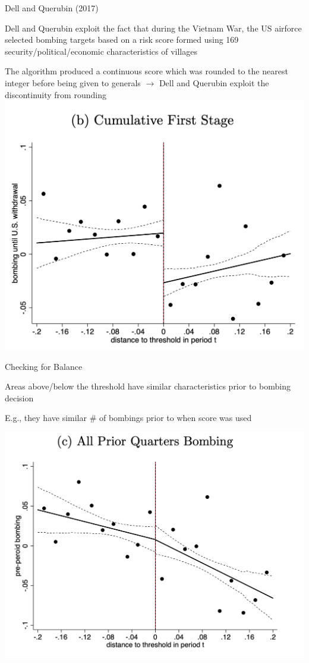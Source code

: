\documentclass[11pt,english,handout]{beamer}
\newenvironment{wideitemize}{\itemize\addtolength{\itemsep}{10pt}}{\enditemize}
\begin{document}
\begin{frame}{Dell and Querubin (2017)}
\begin{wideitemize}
	\item
	Dell and Querubin exploit the fact that during the Vietnam War, the US airforce selected bombing targets based on a risk score formed using 169 security/political/economic characteristics of villages
	
	\item
	The algorithm produced a continuous score which was rounded to the nearest integer before being given to generals $\rightarrow$ Dell and Querubin exploit the discontinuity from rounding
\end{wideitemize}	
\centering 
\includegraphics[width = 0.5\linewidth]{dell-first-stage}
\end{frame}

\begin{frame}{Checking for Balance}
	\begin{wideitemize}
		\item
		Areas above/below the threshold have similar characteristics prior to bombing decision
		
		\item
		E.g., they have similar \# of bombings prior to when score was used
	\end{wideitemize}

\centering 
\includegraphics[width = 0.7\linewidth]{dell-balance}
\end{frame}
\end{document}
